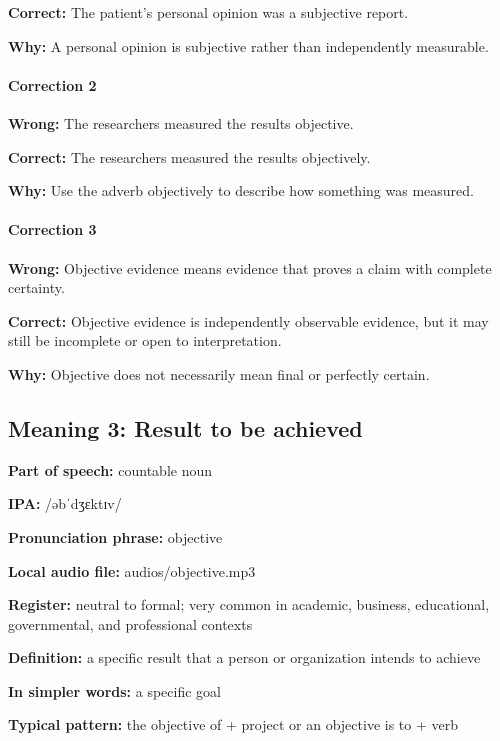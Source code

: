 \documentclass[11pt]{article}
\begin{document}
\textbf{Correct:} The patient's personal opinion was a subjective report.

\textbf{Why:} A personal opinion is subjective rather than independently measurable.

\paragraph{Correction 2}
\textbf{Wrong:} The researchers measured the results objective.

\textbf{Correct:} The researchers measured the results objectively.

\textbf{Why:} Use the adverb objectively to describe how something was measured.

\paragraph{Correction 3}
\textbf{Wrong:} Objective evidence means evidence that proves a claim with complete certainty.

\textbf{Correct:} Objective evidence is independently observable evidence, but it may still be incomplete or open to interpretation.

\textbf{Why:} Objective does not necessarily mean final or perfectly certain.

\subsection{Meaning 3: Result to be achieved}
\textbf{Part of speech:} countable noun

\textbf{IPA:} /əbˈdʒɛktɪv/

\textbf{Pronunciation phrase:} objective

\textbf{Local audio file:} audios/objective.mp3

\textbf{Register:} neutral to formal; very common in academic, business, educational, governmental, and professional contexts

\textbf{Definition:} a specific result that a person or organization intends to achieve

\textbf{In simpler words:} a specific goal

\textbf{Typical pattern:} the objective of + project or an objective is to + verb
\end{document}
